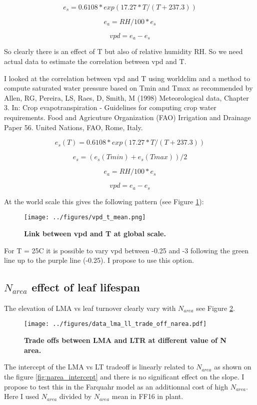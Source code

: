 \documentclass[a4paper,11pt]{article}
\begin{document}
$$e_s = 0.6108 * exp(17.27 * T / (T + 237.3))$$

$$e_a = RH / 100 * e_s $$

$$vpd = e_a - e_s$$

So clearly there is an effect of T but also of relative humidity RH.
So we need actual data to estimate the correlation between vpd and T.

I looked at the correlation between vpd and T using worldclim and a method to compute saturated water pressure based on Tmin and Tmax as recommended by
Allen, RG, Pereira, LS, Raes, D, Smith, M (1998) Meteorological data, Chapter 3. In: Crop evapotranspiration - Guidelines for computing crop water requirements. Food and Agricuture Organization (FAO) Irrigation and Drainage Paper 56. United Nations, FAO, Rome, Italy. 

$$e_s(T) = 0.6108 * exp(17.27 * T / (T + 237.3))$$

$$e_s = (e_s(Tmin)+e_s(Tmax))/2 $$

$$e_a = RH / 100 * e_s $$

$$vpd = e_a - e_s$$

At the world scale this gives the following pattern (see Figure \ref{fig:vpd_t}):
\begin{figure}[ht]
\centering
\texttt{[image: ../figures/vpd\_t\_mean.png]}
\caption{\textbf{Link between vpd and T at global scale.}
\label{fig:vpd_t}}
\end{figure}

 For T = 25C it is possible to vary vpd between -0.25 and -3 following the green line up to the purple line (-0.25). I propose to use this option.
 
\pagebreak
 
 \subsection{$N_{area}$ effect of leaf lifespan}

The elevation of LMA vs leaf turnover clearly vary with $N_{area}$ see Figure \ref{fig:narea_tradeoff}. 

\begin{figure}[ht]
\centering
\texttt{[image: ../figures/data\_lma\_ll\_trade\_off\_narea.pdf]}
\caption{\textbf{Trade offs between LMA and LTR at different value of N area.}
\label{fig:narea_tradeoff}}
\end{figure}

The intercept of the LMA vs LT tradeoff is linearly related to $N_{area}$ as shown on the figure \ref{fig:narea_intercept} and there is no significant effect on the slope. I propose to test this in the Farquahr model as an additionnal cost of high $N_{area}$.  Here I used $N_{area}$ divided by $N_{area}$ mean in FF16 in plant. 
\end{document}
